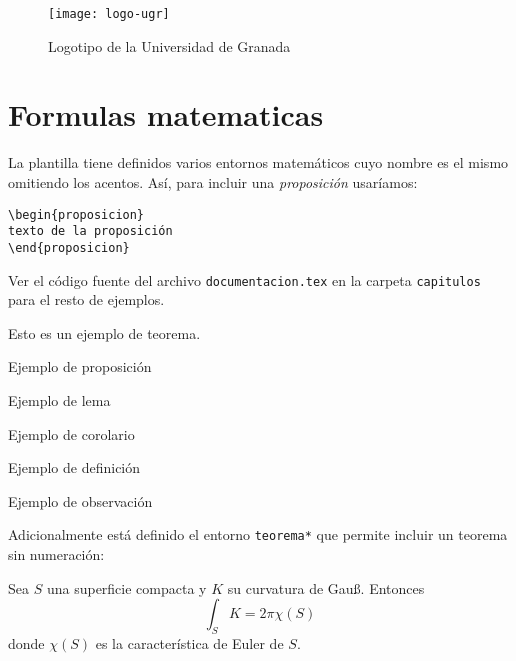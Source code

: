 \begin{figure}[htpb]
  \centering
  \texttt{[image: logo-ugr]}
  \caption{Logotipo de la Universidad de Granada}
  \label{fig:logo-ugr}
\end{figure}

\section{Formulas matematicas}\label{sec:functores}

La plantilla tiene definidos varios entornos matemáticos cuyo nombre es el mismo omitiendo los acentos. Así, para incluir una \emph{proposición} usaríamos:

\begin{verbatim}
\begin{proposicion}
texto de la proposición
\end{proposicion} 
\end{verbatim}

Ver el código fuente del archivo \texttt{documentacion.tex} en la carpeta \texttt{capitulos} para el resto de ejemplos.

\begin{teorema}\label{thm:teorema}
Esto es un ejemplo de teorema.
\end{teorema}

\begin{proposicion}
Ejemplo de proposición
\end{proposicion}

\begin{lema}
Ejemplo de lema
\end{lema}

\begin{corolario}
Ejemplo de corolario
\end{corolario}

\begin{definicion}
Ejemplo de definición
\end{definicion}

\begin{observacion}
Ejemplo de observación
\end{observacion}

Adicionalmente está definido el entorno \texttt{teorema*} que permite incluir un teorema sin numeración:

\begin{teorema*}
  Sea $S$ una superficie compacta y $K$ su curvatura de Gauß. Entonces
\begin{equation}
  \int_S K = 2\pi\chi(S)
\end{equation}
donde $\chi(S)$ es la característica de Euler de $S$.
\end{teorema*}

